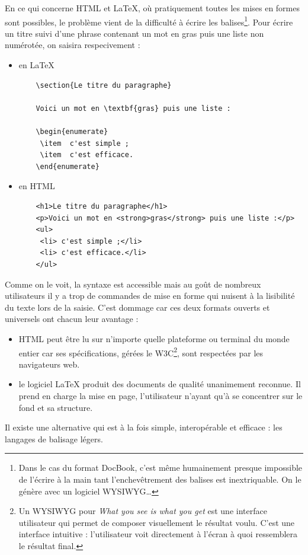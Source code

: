 \documentclass[]{article}
\begin{document}
En ce qui concerne HTML et LaTeX, où pratiquement toutes les mises en
formes sont possibles, le problème vient de la difficulté à écrire les
balises\footnote{Dans le cas du format DocBook, c'est même humainement
  presque impossible de l'écrire à la main tant l'enchevêtrement des
  balises est inextriquable. On le génère avec un logiciel
  WYSIWYG\ldots{}}. Pour écrire un titre suivi d'une phrase contenant un
mot en gras puis une liste non numérotée, on saisira respecivement :

\begin{itemize}
\item
  en LaTeX

\begin{verbatim}
    \section{Le titre du paragraphe}

    Voici un mot en \textbf{gras} puis une liste :

    \begin{enumerate}
     \item  c'est simple ;
     \item  c'est efficace.
    \end{enumerate}
\end{verbatim}
\item
  en HTML

\begin{verbatim}
    <h1>Le titre du paragraphe</h1>
    <p>Voici un mot en <strong>gras</strong> puis une liste :</p>
    <ul>
     <li> c'est simple ;</li>
     <li> c'est efficace.</li>
    </ul>
\end{verbatim}
\end{itemize}
Comme on le voit, la syntaxe est accessible mais au goût de nombreux
utilisateurs il y a trop de commandes de mise en forme qui nuisent à la
lisibilité du texte lors de la saisie. C'est dommage car ces deux
formats ouverts et universels ont chacun leur avantage :

\begin{itemize}
\item
  HTML peut être lu sur n'importe quelle plateforme ou terminal du monde
  entier car ses spécifications, gérées le W3C\footnote{Un WYSIWYG pour
    \emph{What you see is what you get} est une interface utilisateur
    qui permet de composer visuellement le résultat voulu. C'est une
    interface intuitive : l'utilisateur voit directement à l'écran à
    quoi ressemblera le résultat final.}, sont respectées par les
  navigateurs web.
\item
  le logiciel LaTeX produit des documents de qualité unanimement
  reconnue. Il prend en charge la mise en page, l'utilisateur n'ayant
  qu'à se concentrer sur le fond et sa structure.
\end{itemize}
Il existe une alternative qui est à la fois simple, interopérable et
efficace : les langages de balisage légers.
\end{document}
